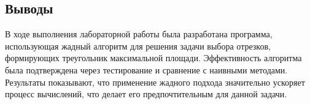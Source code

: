 \documentclass[12pt,a4paper]{article}
\begin{document}
\newpage
\subsection*{Выводы}
В ходе выполнения лабораторной работы была разработана программа, использующая жадный алгоритм для решения задачи выбора отрезков, формирующих треугольник максимальной площади. Эффективность алгоритма была подтверждена через тестирование и сравнение с наивными методами. Результаты показывают, что применение жадного подхода значительно ускоряет процесс вычислений, что делает его предпочтительным для данной задачи.
\end{document}

